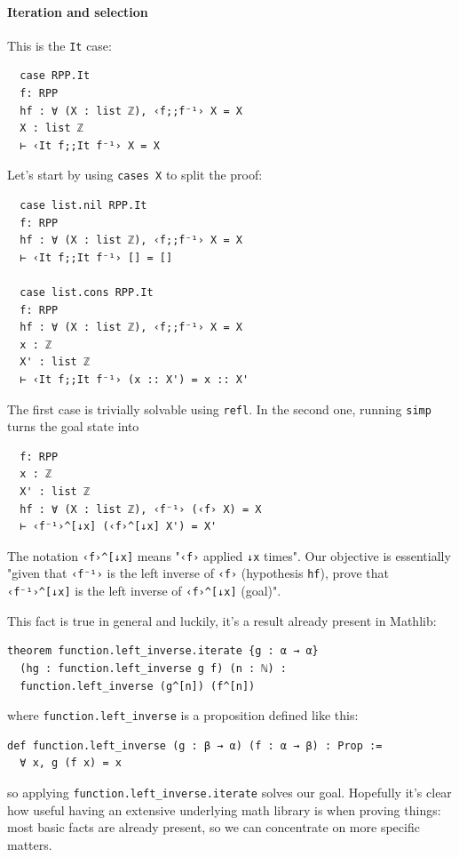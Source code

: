 \documentclass[oneside]{book}
\theoremstyle{definition}
\theoremstyle{remark}
\theoremstyle{plain}
\begin{document}
\paragraph{Iteration and selection}
This is the \lstinline{It} case:
\begin{lstlisting}
  case RPP.It
  f: RPP
  hf : ∀ (X : list ℤ), ‹f;;f⁻¹› X = X
  X : list ℤ
  ⊢ ‹It f;;It f⁻¹› X = X
\end{lstlisting}
Let's start by using \lstinline{cases X} to split the proof:
\begin{lstlisting}
  case list.nil RPP.It
  f: RPP
  hf : ∀ (X : list ℤ), ‹f;;f⁻¹› X = X
  ⊢ ‹It f;;It f⁻¹› [] = []

  case list.cons RPP.It
  f: RPP
  hf : ∀ (X : list ℤ), ‹f;;f⁻¹› X = X
  x : ℤ
  X' : list ℤ
  ⊢ ‹It f;;It f⁻¹› (x :: X') = x :: X'
\end{lstlisting}
The first case is trivially solvable using \lstinline{refl}.
In the second one, running \lstinline{simp} turns the goal state into
\begin{lstlisting}
  f: RPP
  x : ℤ
  X' : list ℤ
  hf : ∀ (X : list ℤ), ‹f⁻¹› (‹f› X) = X
  ⊢ ‹f⁻¹›^[↓x] (‹f›^[↓x] X') = X'
\end{lstlisting}
The notation \lstinline{‹f›^[↓x]} means "\lstinline{‹f›} applied \lstinline{↓x} times".
Our objective is essentially "given that \lstinline{‹f⁻¹›} is the left inverse of \lstinline{‹f›} (hypothesis \lstinline{hf}),
prove that \lstinline{‹f⁻¹›^[↓x]} is the left inverse of \lstinline{‹f›^[↓x]} (goal)".

This fact is true in general and luckily, it's a result already present in Mathlib:
\begin{lstlisting}
theorem function.left_inverse.iterate {g : α → α}
  (hg : function.left_inverse g f) (n : ℕ) :
  function.left_inverse (g^[n]) (f^[n])
\end{lstlisting}
where \lstinline{function.left_inverse} is a proposition defined like this:
\begin{lstlisting}
def function.left_inverse (g : β → α) (f : α → β) : Prop :=
  ∀ x, g (f x) = x
\end{lstlisting}
so applying \lstinline{function.left_inverse.iterate} solves our goal.
Hopefully it's clear how useful having an extensive underlying math library is when proving things:
most basic facts are already present, so we can concentrate on more specific matters.

\paragraph{}
\end{document}
